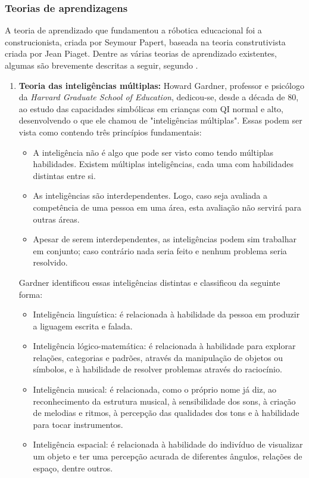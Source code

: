 \subsubsection{Teorias de aprendizagens}
A teoria de aprendizado que fundamentou a róbotica educacional foi a construcionista, criada por Seymour Papert, baseada na teoria construtivista criada por Jean Piaget. Dentre as várias teorias de aprendizado existentes, algumas são brevemente descritas a seguir, segundo \cite{zilli2004robotica}.
\begin{enumerate}
\item \textbf{Teoria das inteligências múltiplas:} Howard Gardner, professor e psicólogo da \textit{Harvard Graduate School of Education}, dedicou-se, desde a década de 80, ao estudo das capacidades simbólicas em crianças com QI normal e alto, desenvolvendo o que ele chamou de "inteligências múltiplas". Essas podem ser vista como contendo três princípios fundamentais:
\begin{itemize}
\item A inteligência não é algo que pode ser visto como tendo múltiplas habilidades. Existem múltiplas inteligências, cada uma com habilidades distintas entre si.
\item  As inteligências são interdependentes. Logo, caso seja avaliada a competência de uma pessoa em uma área, esta avaliação não servirá para outras áreas.
\item Apesar de serem interdependentes, as inteligências podem sim trabalhar em conjunto; caso contrário nada seria feito e nenhum problema seria resolvido.
\end{itemize}
Gardner identificou essas inteligências distintas e classificou da seguinte forma:
\begin{itemize}
\item Inteligência linguística: é relacionada à habilidade da pessoa em produzir a liguagem escrita e falada.
\item Inteligência lógico-matemática: é relacionada à habilidade para explorar relações, categorias e padrões, através da manipulação de objetos ou símbolos, e à habilidade de resolver problemas através do raciocínio.
\item Inteligência musical: é relacionada, como o próprio nome já diz, ao reconhecimento da estrutura musical, à sensibilidade dos sons, à criação de melodias e ritmos, à percepção das qualidades dos tons e à habilidade para tocar instrumentos.
\item Inteligência espacial: é relacionada à habilidade do indivíduo de visualizar um objeto e ter uma percepção acurada de diferentes ângulos, relações de espaço, dentre outros.

\end{itemize}
\end{enumerate}
